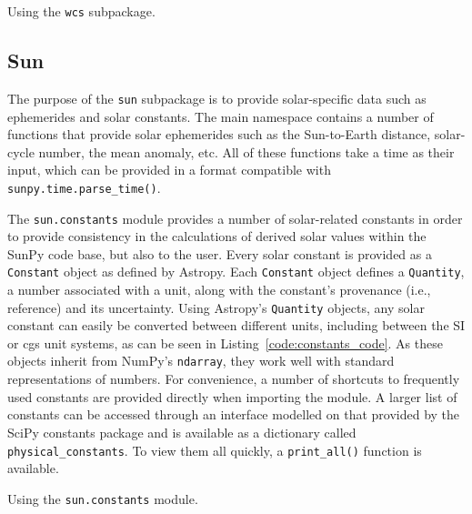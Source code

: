 \begin{listing}[H]
\caption{Using the \texttt{wcs} subpackage.}
\label{code:wcs_code}
\end{listing}

\subsection{Sun}\label{ssec:util:sun}
The purpose of the \texttt{sun} subpackage is to provide solar-specific data such as ephemerides and
solar constants. The main namespace contains a number of functions that provide solar
ephemerides such as the Sun-to-Earth distance, solar-cycle number, the mean 
anomaly, etc.
All of these functions take a time as their input, which can be provided in a format
compatible with \texttt{sunpy.time.parse\_time()}. 

The \texttt{sun.constants} module provides a number of solar-related 
constants in order to provide consistency in the calculations of derived solar 
values  within the SunPy code base, but also to the user. Every solar 
constant is provided as a \texttt{Constant} object as defined by Astropy. Each 
\texttt{Constant} object defines a \texttt{Quantity}, a number associated with a unit, along with 
the constant's provenance (i.e., reference) and its uncertainty. Using 
Astropy's \texttt{Quantity} objects, any solar constant can easily be converted between 
different units, including between the SI or cgs unit systems, as can be seen in Listing~\ref{code:constants_code}.
As these objects inherit from 
NumPy's \texttt{ndarray}, they work well with standard representations of numbers.
For convenience, a number of shortcuts to frequently used constants are provided 
directly when importing the module. A larger list of constants can be 
accessed through an interface modelled on that provided by the SciPy constants 
package and is available as a dictionary called \texttt{physical\_constants}. 
To view them all quickly, a \texttt{print\_all()} function is available.

\begin{listing}[H]
\caption{Using the \texttt{sun.constants} module.}
\label{code:constants_code}
\end{listing}
	
